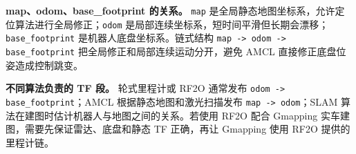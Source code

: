 \documentclass[11pt,a4paper,fontset=fandol]{ctexart}
\begin{document}
\textbf{map、odom、base\_footprint 的关系。}
\verb|map| 是全局静态地图坐标系，允许定位算法进行全局修正；\verb|odom| 是局部连续坐标系，短时间平滑但长期会漂移；\verb|base_footprint| 是机器人底盘坐标系。链式结构 \verb|map -> odom -> base_footprint| 把全局修正和局部连续运动分开，避免 AMCL 直接修正底盘位姿造成控制跳变。

\textbf{不同算法负责的 TF 段。}
轮式里程计或 RF2O 通常发布 \verb|odom -> base_footprint|；AMCL 根据静态地图和激光扫描发布 \verb|map -> odom|；SLAM 算法在建图时估计机器人与地图之间的关系。若使用 RF2O 配合 Gmapping 实车建图，需要先保证雷达、底盘和静态 TF 正确，再让 Gmapping 使用 RF2O 提供的里程计链。
\end{document}
